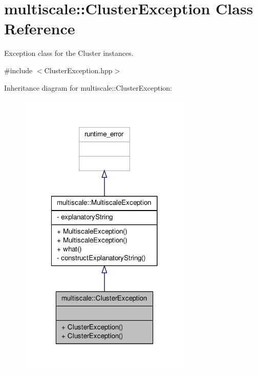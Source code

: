 \hypertarget{classmultiscale_1_1ClusterException}{\section{multiscale\-:\-:Cluster\-Exception Class Reference}
\label{classmultiscale_1_1ClusterException}
}


Exception class for the Cluster instances.  




{\ttfamily \#include $<$Cluster\-Exception.\-hpp$>$}



Inheritance diagram for multiscale\-:\-:Cluster\-Exception\-:
\nopagebreak
\begin{figure}[H]
\begin{center}
\leavevmode
\includegraphics[width=234pt]{classmultiscale_1_1ClusterException__inherit__graph}
\end{center}
\end{figure}


